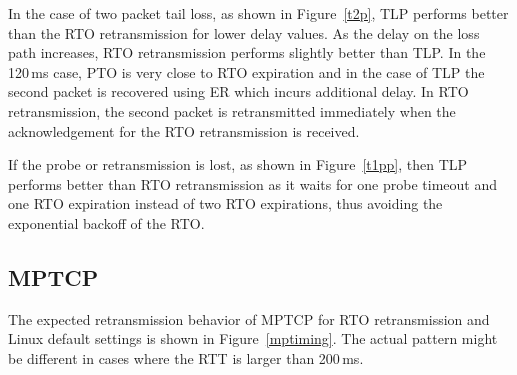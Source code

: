 \documentclass[10pt,conference]{IEEEtran}
\begin{document}
In the case of two packet tail loss, as shown 
in Figure~\ref{t2p}, TLP performs better than the RTO retransmission for lower delay values. As the delay on the loss path increases, RTO retransmission performs 
slightly better than TLP. In the 120\,ms case, PTO is very close to RTO expiration and in the case of TLP the second packet is recovered 
using ER which incurs additional delay. In RTO retransmission, the second packet is retransmitted immediately when the acknowledgement
for the RTO retransmission is received. 

If the probe or retransmission is lost, as shown 
in Figure~\ref{t1pp}, then TLP performs better than RTO retransmission as it waits for one 
probe timeout and one RTO expiration instead of two RTO expirations, thus avoiding the exponential backoff of the RTO.

\subsection{MPTCP}


The expected retransmission behavior of MPTCP for RTO retransmission and Linux default settings is shown 
in Figure~\ref{mptiming}. The actual pattern might be different in cases where the RTT is larger than 200\,ms. 
\end{document}
